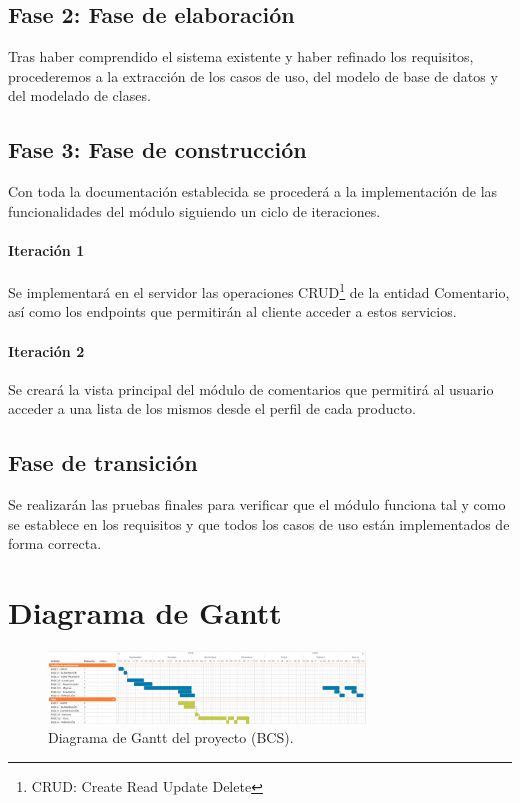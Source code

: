 \subsection{Fase 2: Fase de elaboración}

Tras haber comprendido el sistema existente y haber refinado los requisitos, procederemos a la extracción de los casos de uso, del modelo de base de datos y del modelado de clases.

\subsection{Fase 3: Fase de construcción}

Con toda la documentación establecida se procederá a la implementación de las funcionalidades del módulo siguiendo un ciclo de iteraciones.

\paragraph{Iteración 1} Se implementará en el servidor las operaciones CRUD\footnote{CRUD: Create Read Update Delete} de la entidad Comentario, así como los endpoints que permitirán al cliente acceder a estos servicios.

\paragraph{Iteración 2} Se creará la vista principal del módulo de comentarios que permitirá al usuario acceder a una lista de los mismos desde el perfil de cada producto.

\subsection{Fase de transición}

Se realizarán las pruebas finales para verificar que el módulo funciona tal y como se establece en los requisitos y que todos los casos de uso están implementados de forma correcta.

\section{Diagrama de Gantt}

\begin{figure}[!ht]
	\centering
	\includegraphics[width=0.75\textwidth]{imaxes/gantt.png}
	\caption{Diagrama de Gantt del proyecto (BCS).}
	\label{gant}
\end{figure}


